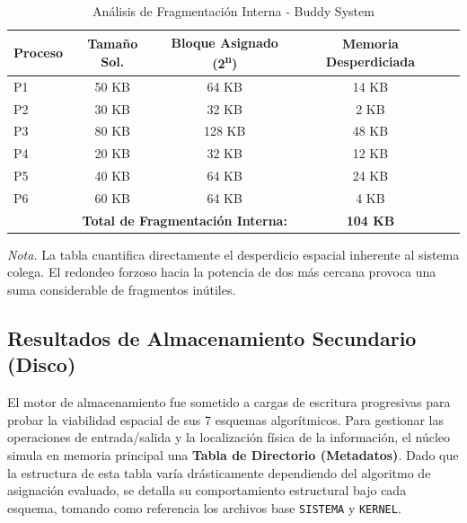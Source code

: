 \documentclass[12pt,a4paper]{article}
\begin{document}
\begin{table}[H]
\centering\footnotesize
\caption{Análisis de Fragmentación Interna - Buddy System}
\begin{tabularx}{\textwidth}{l c c c c}
\toprule
\textbf{Proceso} & \textbf{Tamaño Sol.} & \textbf{Bloque Asignado (2\textsuperscript{n})} & \textbf{Memoria Desperdiciada} \\
\midrule
P1 & 50 KB & 64 KB & 14 KB \\
P2 & 30 KB & 32 KB & 2 KB \\
P3 & 80 KB & 128 KB & 48 KB \\
P4 & 20 KB & 32 KB & 12 KB \\
P5 & 40 KB & 64 KB & 24 KB \\
P6 & 60 KB & 64 KB & 4 KB \\
\midrule
\multicolumn{3}{r}{\textbf{Total de Fragmentación Interna:}} & \textbf{104 KB} \\
\bottomrule
\end{tabularx}
    \par\vspace{0.2cm}\raggedright \textit{Nota.} La tabla cuantifica directamente el desperdicio espacial inherente al sistema colega. El redondeo forzoso hacia la potencia de dos más cercana provoca una suma considerable de fragmentos inútiles.
\end{table}

\subsection{Resultados de Almacenamiento Secundario (Disco)}
El motor de almacenamiento fue sometido a cargas de escritura progresivas para probar la viabilidad espacial de sus 7 esquemas algorítmicos. Para gestionar las operaciones de entrada/salida y la localización física de la información, el núcleo simula en memoria principal una \textbf{Tabla de Directorio (Metadatos)}. Dado que la estructura de esta tabla varía drásticamente dependiendo del algoritmo de asignación evaluado, se detalla su comportamiento estructural bajo cada esquema, tomando como referencia los archivos base \texttt{SISTEMA} y \texttt{KERNEL}.
\end{document}
